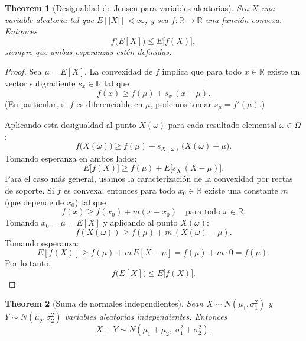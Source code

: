 \documentclass[11pt,a4paper]{article}
\theoremstyle{plain}
\newtheorem{theorem}{Theorem}[section]
\theoremstyle{definition}
\theoremstyle{remark}
\begin{document}

\begin{theorem}[Desigualdad de Jensen para variables aleatorias]
Sea $X$ una variable aleatoria tal que $E[|X|] < \infty$, y sea $f \colon \mathbb{R} \to \mathbb{R}$ una función convexa. Entonces
\[
f\bigl(E[X]\bigr) \leq E\bigl[f(X)\bigr],
\]
siempre que ambas esperanzas estén definidas.
\end{theorem}

\begin{proof}
Sea $\mu = E[X]$. La convexidad de $f$ implica que para todo $x \in \mathbb{R}$ existe un vector subgradiente $s_x \in \mathbb{R}$ tal que
\[
f(x) \geq f(\mu) + s_x\,(x - \mu).
\]
(En particular, si $f$ es diferenciable en $\mu$, podemos tomar $s_\mu = f'(\mu)$.)

Aplicando esta desigualdad al punto $X(\omega)$ para cada resultado elemental $\omega \in \Omega$:
\[
f\bigl(X(\omega)\bigr) \geq f(\mu) + s_{X(\omega)}\,\bigl(X(\omega) - \mu\bigr).
\]
Tomando esperanza en ambos lados:
\[
E\bigl[f(X)\bigr] \geq f(\mu) + E\bigl[s_X\,(X - \mu)\bigr].
\]
Para el caso más general, usamos la caracterización de la convexidad por rectas de soporte. Si $f$ es convexa, entonces para todo $x_0 \in \mathbb{R}$ existe una constante $m$ (que depende de $x_0$) tal que
\[
f(x) \geq f(x_0) + m(x - x_0) \quad \text{para todo } x \in \mathbb{R}.
\]
Tomando $x_0 = \mu = E[X]$ y aplicando al punto $X(\omega)$:
\[
f(X(\omega)) \geq f(\mu) + m\,(X(\omega) - \mu).
\]
Tomando esperanza:
\[
E[f(X)] \geq f(\mu) + m\,E[X - \mu] = f(\mu) + m \cdot 0 = f(\mu).
\]
Por lo tanto,
\[
f\bigl(E[X]\bigr) \leq E\bigl[f(X)\bigr].
\]
\end{proof}


\begin{theorem}[Suma de normales independientes]
Sean $X \sim N(\mu_1, \sigma_1^2)$ y $Y \sim N(\mu_2, \sigma_2^2)$ variables aleatorias independientes. Entonces
\[
X + Y \sim N(\mu_1 + \mu_2,\; \sigma_1^2 + \sigma_2^2).
\]
\end{theorem}
\end{document}
